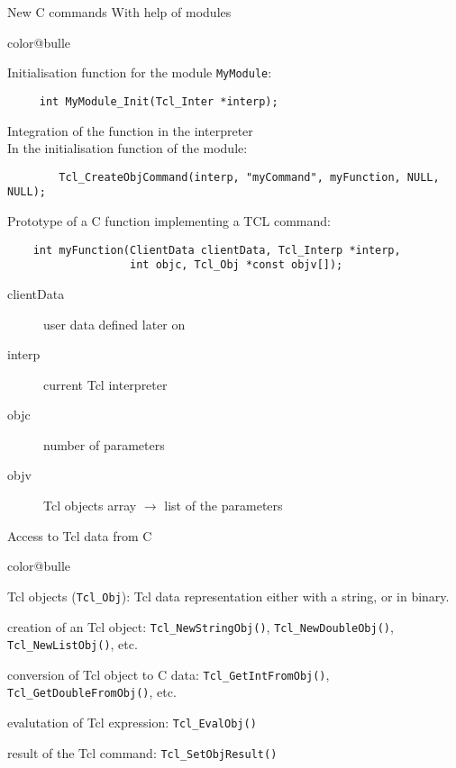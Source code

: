 \documentclass[a4paper,landscape,smooth]{show}
\begin{document}
\begin{tslide}{New C commands}
   \vfill
   With help of modules
   \begin{bitemize}{color@bulle}
      \item Initialisation function for the module \texttt{MyModule}:
      \begin{verbatim}
	 int MyModule_Init(Tcl_Inter *interp);
      \end{verbatim}

      \item Integration of the function in the interpreter\\
	 In the initialisation function of the module:
	 \begin{verbatim}
	    Tcl_CreateObjCommand(interp, "myCommand", myFunction, NULL, NULL);
	 \end{verbatim}

      \item Prototype of a C function implementing a TCL command:
	 \begin{verbatim}
    int myFunction(ClientData clientData, Tcl_Interp *interp,
                   int objc, Tcl_Obj *const objv[]);
	 \end{verbatim}

	 \begin{description}
	    \item[clientData] user data defined later on
	    \item[interp] current Tcl interpreter
	    \item[objc] number of parameters
	    \item[objv] Tcl objects array $\rightarrow$ list of the parameters
	 \end{description}
   \end{bitemize}
   \vfill
\end{tslide}


\begin{tslide}{Access to Tcl data from C}
   \vfill
   \begin{bitemize}{color@bulle}
      \item Tcl objects (\texttt{Tcl\_Obj}): Tcl data representation
         either with a string, or in binary. 
      \item creation of an Tcl object: \texttt{Tcl\_NewStringObj()},
	 \texttt{Tcl\_NewDoubleObj()}, \texttt{Tcl\_NewListObj()}, etc.
      \item conversion of Tcl object to C data:
	 \texttt{Tcl\_GetIntFromObj()}, \texttt{Tcl\_GetDoubleFromObj()},
         etc.
      \item evalutation of Tcl expression: \texttt{Tcl\_EvalObj()}
      \item result of the Tcl command: \texttt{Tcl\_SetObjResult()}
   \end{bitemize}
   \vfill
\end{tslide}
\end{document}
